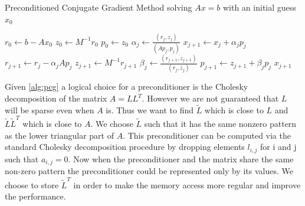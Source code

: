 \begin{algorithm}[H]
\centering
\caption{Preconditioned Conjugate Gradient Method solving $Ax=b$ with an initial guess $x_0$}\label{alg:pcg}
\begin{algorithmic}[1]
			\State $r_0 \gets b - Ax_0$
			\State $z_0 \gets M^{-1}r_0$\label{alg-line:apply-preconditioner}
			\State $p_0 \gets z_0$
				\State $\alpha_j \gets \frac{(r_j, z_j)}{(Ap_j, p_j)}$
				\State $x_{j+1} \gets x_j + \alpha_j p_j$
				\State $r_{j+1} \gets r_j - \alpha_j Ap_j$
				\State $z_{j+1} \gets M^{-1}r_{j+1}$
				\State $\beta_j \gets \frac{(r_{j+1}, z_{j+1})}{(r_j, z_j)}$
				\State $p_{j+1} \gets z_{j+1} + \beta_j p_j$
			\EndFor
			\State \Return $x_{j+1}$
		\EndProcedure
\end{algorithmic}
\end{algorithm}

Given \cref{alg:pcg} a logical choice for a preconditioner is the Cholesky decomposition of the matrix $A = LL^T$. However we are not guaranteed that $L$ will be sparse even when $A$ is. Thus we want to find $\widetilde{L}$ which is close to $L$ and $\widetilde{L}\widetilde{L}^T$ which is close to $A$. We choose $\widetilde{L}$ such that it has the same nonzero pattern as the lower triangular part of $A$. This preconditioner can be computed via the standard Cholesky decomposition procedure by dropping elements $l_{i,j}$ for i and j such that $a_{i,j} = 0$. Now when the preconditioner and the matrix share the same non-zero pattern the preconditioner could be represented only by its values. We choose to store $\widetilde{L}^T$ in order to make the memory access more regular and improve the performance.

